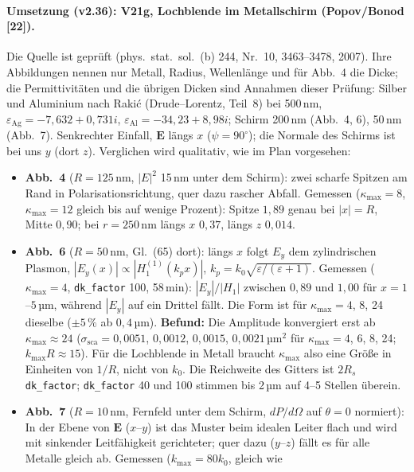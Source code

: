 \paragraph{Umsetzung (v2.36): V21g, Lochblende im Metallschirm (Popov/Bonod [22]).}
Die Quelle ist geprüft (phys.\ stat.\ sol.\ (b) 244, Nr.~10, 3463--3478, 2007). Ihre Abbildungen nennen nur
Metall, Radius, Wellenlänge und für Abb.~4 die Dicke; die Permittivitäten und die übrigen Dicken sind Annahmen dieser
Prüfung: Silber und Aluminium nach Rakić (Drude--Lorentz, Teil~8) bei 500\,nm, $\varepsilon_{\text{Ag}}=-7{,}632+0{,}731i$,
$\varepsilon_{\text{Al}}=-34{,}23+8{,}98i$; Schirm 200\,nm (Abb.~4, 6), 50\,nm (Abb.~7). Senkrechter Einfall, $\mathbf E$
längs $x$ ($\psi=90^\circ$); die Normale des Schirms ist bei uns $y$ (dort $z$). Verglichen wird qualitativ, wie im
Plan vorgesehen:
\begin{itemize}[nosep]
  \item \textbf{Abb.~4} ($R=125$\,nm, $|E|^2$ 15\,nm unter dem Schirm): zwei scharfe Spitzen am Rand in
        Polarisationsrichtung, quer dazu rascher Abfall. Gemessen ($\kappa_{\max}=8$, $\kappa_{\max}=12$ gleich bis
        auf wenige Prozent): Spitze $1{,}89$ genau bei $|x|=R$, Mitte $0{,}90$; bei $r=250$\,nm längs $x$
        $0{,}37$, längs $z$ $0{,}014$.
  \item \textbf{Abb.~6} ($R=50$\,nm, Gl.~(65) dort): längs $x$ folgt $E_y$ dem zylindrischen Plasmon,
        $|E_y(x)|\propto|H^{(1)}_1(k_px)|$, $k_p=k_0\sqrt{\varepsilon/(\varepsilon+1)}$. Gemessen
        ($\kappa_{\max}=4$, \verb|dk_factor| 100, 58\,min): $|E_y|/|H_1|$ zwischen $0{,}89$ und $1{,}00$ für
        $x=1$--$5$\,µm, während $|E_y|$ auf ein Drittel fällt. Die Form ist für $\kappa_{\max}=4$, 8, 24 dieselbe
        ($\pm5\,\%$ ab $0{,}4$\,µm). \textbf{Befund:} Die Amplitude konvergiert erst ab $\kappa_{\max}\approx24$
        ($\sigma_{\text{sca}}=0{,}0051$, $0{,}0012$, $0{,}0015$, $0{,}0021$\,µm$^2$ für $\kappa_{\max}=4$, 6, 8, 24;
        $k_{\max}R\approx15$). Für die Lochblende in Metall braucht $\kappa_{\max}$ also eine Größe in Einheiten
        von $1/R$, nicht von $k_0$. Die Reichweite des Gitters ist $2R_s\,$\verb|dk_factor|; \verb|dk_factor| 40 und 100
        stimmen bis 2\,µm auf 4--5 Stellen überein.
  \item \textbf{Abb.~7} ($R=10$\,nm, Fernfeld unter dem Schirm, $dP/d\Omega$ auf $\theta=0$ normiert): In der Ebene
        von $\mathbf E$ ($x$--$y$) ist das Muster beim idealen Leiter flach und wird mit sinkender Leitfähigkeit
        gerichteter; quer dazu ($y$--$z$) fällt es für alle Metalle gleich ab. Gemessen ($k_{\max}=80k_0$, gleich wie

\end{itemize}
